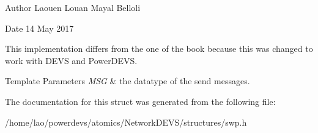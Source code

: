 \begin{DoxyAuthor}{Author}
Laouen Louan Mayal Belloli 
\end{DoxyAuthor}
\begin{DoxyDate}{Date}
14 May 2017
\end{DoxyDate}
This implementation differs from the one of the book because this was changed to work with D\+E\+VS and Power\+D\+E\+VS.


\begin{DoxyTemplParams}{Template Parameters}
{\em M\+SG} & the datatype of the send messages. \\
\hline
\end{DoxyTemplParams}


The documentation for this struct was generated from the following file\+:\begin{DoxyCompactItemize}
\item 
/home/lao/powerdevs/atomics/\+Network\+D\+E\+V\+S/structures/swp.\+h\end{DoxyCompactItemize}
